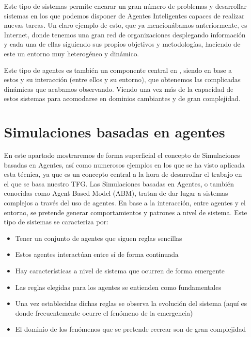 Este tipo de sistemas permite encarar un gran número de problemas y desarrollar sistemas en los que podemos disponer de Agentes Inteligentes capaces de realizar nuevas tareas. Un claro ejemplo de esto, que ya mencionábamos anteriormente, es Internet, donde tenemos una gran red de organizaciones desplegando información y cada una de ellas siguiendo sus propios objetivos y metodologías, haciendo de este un entorno muy heterogéneo y dinámico.

Este tipo de agentes es también un componente central en \cite{park2023generative}, siendo en base a estos y su interacción (entre ellos y su entorno), que obtenemos las complicadas dinámicas que acabamos observando. Viendo una vez más de la capacidad de estos sistemas para acomodarse en dominios cambiantes y de gran complejidad.

\section{Simulaciones basadas en agentes}

En este apartado mostraremos de forma superficial el concepto de Simulaciones basadas en Agentes, así como numerosos ejemplos en los que se ha visto aplicada esta técnica, ya que es un concepto central a la hora de desarrollar el trabajo \cite{park2023generative} en el que se basa nuestro TFG.
Las Simulaciones basadas en Agentes, o también conocidas como Agent-Based Model (ABM), tratan de dar lugar a sistemas complejos a través del uso de agentes. En base a la interacción, entre agentes y el entorno, se pretende generar comportamientos y patrones a nivel de sistema.
Este tipo de sistemas se caracteriza por:
\begin{itemize}
	\item Tener un conjunto de agentes que siguen reglas sencillas
	\item Estos agentes interactúan entre sí de forma continuada
	\item Hay características a nivel de sistema que ocurren de forma emergente
	\item Las reglas elegidas para los agentes se entienden como fundamentales
	\item Una vez establecidas dichas reglas se observa la evolución del sistema (aquí es donde frecuentemente ocurre el fenómeno de la emergencia)
	\item El dominio de los fenómenos que se pretende recrear son de gran complejidad
\end{itemize}

